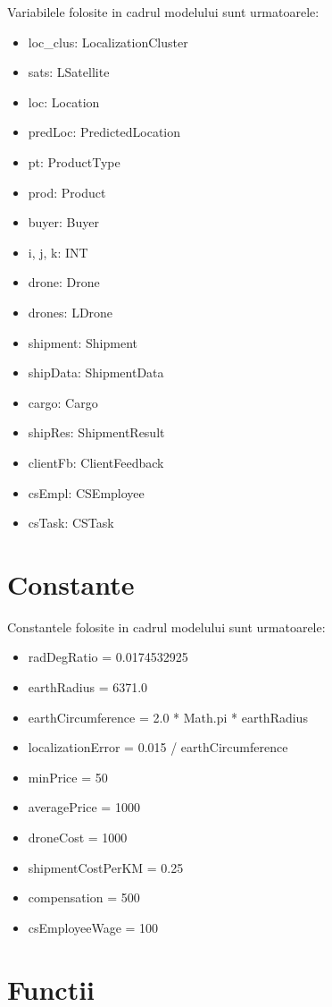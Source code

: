 \begin{spacing}{1.5}
Variabilele folosite in cadrul modelului sunt urmatoarele:
\begin{itemize}
\item loc\_clus: LocalizationCluster
\item sats: LSatellite
\item loc: Location
\item predLoc: PredictedLocation
\item pt: ProductType
\item prod: Product
\item buyer: Buyer
\item i, j, k: INT
\item drone: Drone
\item drones: LDrone
\item shipment: Shipment
\item shipData: ShipmentData
\item cargo: Cargo
\item shipRes: ShipmentResult
\item clientFb: ClientFeedback
\item csEmpl: CSEmployee
\item csTask: CSTask
\end{itemize}

\section{Constante}

Constantele folosite in cadrul modelului sunt urmatoarele:
\begin{itemize}
\item radDegRatio = 0.0174532925
\item earthRadius = 6371.0
\item earthCircumference = 2.0 * Math.pi * earthRadius
\item localizationError = 0.015 / earthCircumference
\item minPrice = 50
\item averagePrice = 1000
\item droneCost = 1000
\item shipmentCostPerKM = 0.25
\item compensation = 500
\item csEmployeeWage = 100
\end{itemize}

\section{Functii}


\end{spacing}
